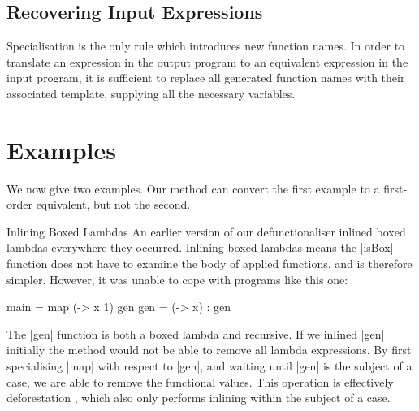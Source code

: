 \documentclass[preprint]{sigplanconf}
\begin{document}
\subsection{Recovering Input Expressions}
\label{sec:recover}

Specialisation is the only rule which introduces new function names. In order to translate an expression in the output program to an equivalent expression in the input program, it is sufficient to replace all generated function names with their associated template, supplying all the necessary variables.

\section{Examples}
\label{sec:examples}

We now give two examples. Our method can convert the first example to a first-order equivalent, but not the second.

\begin{examplename}{Inlining Boxed Lambdas}
\label{ex:inlining_boxed_lambdas}
An earlier version of our defunctionaliser inlined boxed lambdas everywhere they occurred. Inlining boxed lambdas means the |isBox| function does not have to examine the body of applied functions, and is therefore simpler. However, it was unable to cope with programs like this one:

\begin{code}
main = map (\x -> x 1) gen
gen = (\x -> x) : gen
\end{code}

The |gen| function is both a boxed lambda and recursive. If we inlined |gen| initially the method would not be able to remove all lambda expressions. By first specialising |map| with respect to |gen|, and waiting until |gen| is the subject of a case, we are able to remove the functional values. This operation is effectively deforestation \cite{wadler:deforestation}, which also only performs inlining within the subject of a case.
\end{examplename}
\end{document}
